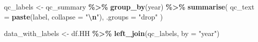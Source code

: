 \documentclass[
]{article}
\newenvironment{Shaded}{\begin{snugshade}}{\end{snugshade}}
\newcommand{\AttributeTok}[1]{\textcolor[rgb]{0.13,0.29,0.53}{#1}}
\newcommand{\FunctionTok}[1]{\textcolor[rgb]{0.13,0.29,0.53}{\textbf{#1}}}
\newcommand{\NormalTok}[1]{#1}
\newcommand{\OtherTok}[1]{\textcolor[rgb]{0.56,0.35,0.01}{#1}}
\newcommand{\SpecialCharTok}[1]{\textcolor[rgb]{0.81,0.36,0.00}{\textbf{#1}}}
\newcommand{\StringTok}[1]{\textcolor[rgb]{0.31,0.60,0.02}{#1}}
\begin{document}
\begin{Shaded}
\begin{Highlighting}[]
\NormalTok{qc\_labels }\OtherTok{\textless{}{-}}\NormalTok{ qc\_summary }\SpecialCharTok{\%\textgreater{}\%}
  \FunctionTok{group\_by}\NormalTok{(year) }\SpecialCharTok{\%\textgreater{}\%}
  \FunctionTok{summarise}\NormalTok{(}
    \AttributeTok{qc\_text =} \FunctionTok{paste}\NormalTok{(label, }\AttributeTok{collapse =} \StringTok{"}\SpecialCharTok{\textbackslash{}n}\StringTok{"}\NormalTok{),}
    \AttributeTok{.groups =} \StringTok{"drop"}
\NormalTok{  )}

\NormalTok{data\_with\_labels }\OtherTok{\textless{}{-}}\NormalTok{ df.HH }\SpecialCharTok{\%\textgreater{}\%}
  \FunctionTok{left\_join}\NormalTok{(qc\_labels, }\AttributeTok{by =} \StringTok{"year"}\NormalTok{)}


\end{Highlighting}
\end{Shaded}
\end{document}

